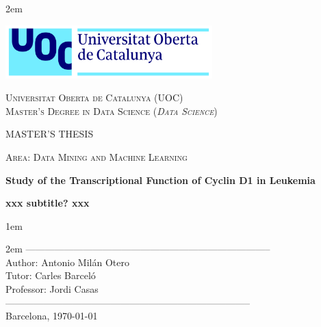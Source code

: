 \newpage
\thispagestyle{empty}

\baselineskip 2em


\centerline{\includegraphics[width=0.6\textwidth]{images/UOC-logo}}
\begin{center}
\textsc{Universitat Oberta de Catalunya (UOC) \\
 Master's Degree in Data Science (\textit{Data Science})\\}


\vspace*{1.5cm}

\textsc{\Large MASTER'S THESIS}

\vspace*{0.5cm}

\textsc{\large Area: Data Mining and Machine Learning}



\vspace*{2.0cm}

\textbf{\Large Study of the Transcriptional Function of Cyclin D1 in Leukemia}

\textbf{\large xxx subtitle? xxx}

\vspace{2.5cm}
\baselineskip 1em

\baselineskip 2em
-----------------------------------------------------------------------------\\
Author:     Antonio Milán Otero\\
Tutor:      Carles Barceló\\
Professor:  Jordi Casas\\
-----------------------------------------------------------------------------\\
\vspace*{1.5cm}
Barcelona, \today

\end{center}

\newpage
\pagestyle{empty}
\hfill
